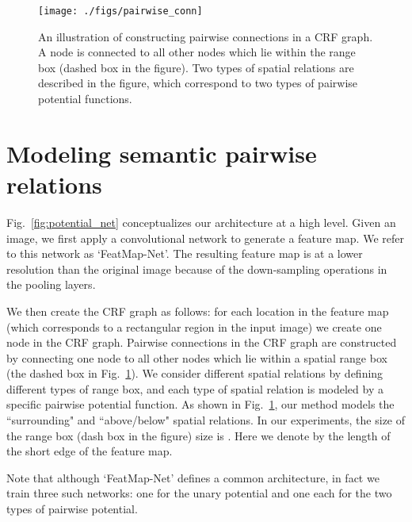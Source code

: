 









\begin{figure}[t]
	\center
	\texttt{[image: ./figs/pairwise\_conn]}
\caption{An illustration of constructing pairwise connections in a CRF graph.
A node is connected to all other nodes which lie within the range box (dashed box in the figure).
Two types of spatial relations are described in the figure, which
correspond to two types of pairwise potential functions.
}
\label{fig:pairwise}
\end{figure}











\section{Modeling semantic pairwise relations}

Fig.~\ref{fig:potential_net} conceptualizes our architecture at a high level.
Given an image, we first apply a convolutional network to generate a feature map.
We refer to this network as `FeatMap-Net'.
The resulting feature map is at a lower resolution than the original image because of the down-sampling operations in the pooling layers.


We then create the CRF graph as follows:
for each location in the feature map (which corresponds to a rectangular region in the input image) we create one node in the CRF graph.
Pairwise connections in the CRF graph are constructed by connecting one node to all other nodes 
which lie within a spatial range box (the dashed box in Fig.~\ref{fig:pairwise}).
We consider different spatial relations by defining different types of range box, and each type of spatial relation is modeled by a specific pairwise potential function.
As shown in Fig.~\ref{fig:pairwise},  our method models the ``surrounding" and ``above/below" spatial relations.
In our experiments, the size of the range box (dash box in the figure) size is .
Here we denote by  the length of the short edge of the feature map.


Note that although `FeatMap-Net' defines a common architecture, in fact we train three such networks: one for the unary potential and one each for the two types of pairwise potential.





